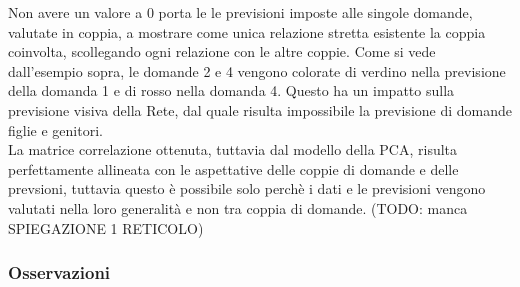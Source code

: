 Non avere un valore a 0 porta le le previsioni imposte alle singole domande, valutate in coppia, a mostrare come unica relazione stretta esistente la coppia coinvolta, scollegando ogni relazione con le altre coppie. Come si vede dall'esempio sopra, le domande 2 e 4 vengono colorate di verdino nella previsione della domanda 1 e di rosso nella domanda 4. Questo ha un impatto sulla previsione visiva della Rete, dal quale risulta impossibile la previsione di domande figlie e genitori.\\
La matrice correlazione ottenuta, tuttavia dal modello della PCA, risulta perfettamente allineata con le aspettative delle coppie di domande e delle prevsioni, tuttavia questo \`e possibile solo perch\`e i dati e le previsioni vengono valutati nella loro generalit\`a e non tra coppia di domande. (TODO: manca SPIEGAZIONE 1 RETICOLO)

\subsubsection{Osservazioni}
